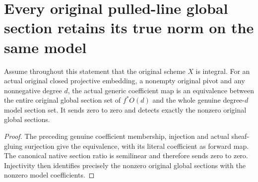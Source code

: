 \section{Every original pulled-line global section retains its true norm on the same model}
\label{sec:native-pulled-projective-section-norms}

\begin{theorem}
\label{thm:native-pulled-projective-section-equivalence}
\leanok
{}
Assume throughout this statement that the original scheme $X$ is integral.
For an actual original closed projective embedding, a nonempty original
pivot and any nonnegative degree $d$, the actual generic coefficient map
is an equivalence between the entire original global section set of
$f^*O(d)$ and the whole genuine degree-$d$ model section set. It sends zero
to zero and detects exactly the nonzero original global sections.
\end{theorem}
\begin{proof}
The preceding genuine coefficient membership, injection and actual
sheaf-gluing surjection give the equivalence, with its literal coefficient
as forward map. The canonical native section ratio is semilinear and
therefore sends zero to zero. Injectivity then identifies precisely the
nonzero original global sections with the nonzero model coefficients.
\end{proof}

